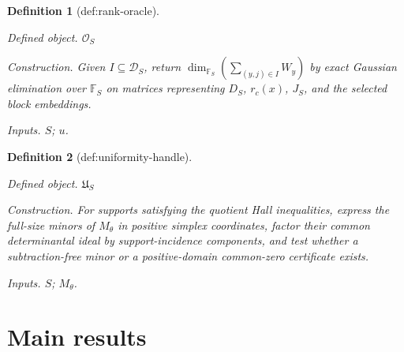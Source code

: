 \documentclass{article}
\newtheorem{definition}{Definition}
\begin{document}
\begin{definition}[def:rank-oracle]\label{def:rank-oracle}
\par\smallskip\noindent\emph{Defined object.} \(\mathcal O_S\)
\par\smallskip\noindent\emph{Construction.} Given \(I\subseteq\mathcal D_S\), return \(\dim_{\mathbb F_S}(\sum_{(y,j)\in I}W_y)\) by exact Gaussian elimination over \(\mathbb F_S\) on matrices representing \(D_S\), \(r_c(x)\), \(J_S\), and the selected block embeddings.
\par\smallskip\noindent\emph{Inputs.} \(S\); \(u\).
\end{definition}

\begin{definition}[def:uniformity-handle]\label{def:uniformity-handle}
\par\smallskip\noindent\emph{Defined object.} \(\mathfrak U_S\)
\par\smallskip\noindent\emph{Construction.} For supports satisfying the quotient Hall inequalities, express the full-size minors of \(M_\theta\) in positive simplex coordinates, factor their common determinantal ideal by support-incidence components, and test whether a subtraction-free minor or a positive-domain common-zero certificate exists.
\par\smallskip\noindent\emph{Inputs.} \(S\); \(M_\theta\).
\end{definition}

\section{Main results}
\end{document}
